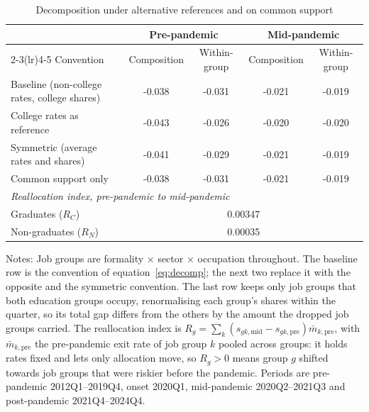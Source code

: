 \begin{table}[H]
\centering
\caption{Decomposition under alternative references and on common support}
\label{tab:decomp_variants}
\begin{threeparttable}
\begin{tabular}{lcccc}
\toprule
& \multicolumn{2}{c}{Pre-pandemic} & \multicolumn{2}{c}{Mid-pandemic} \\
\cmidrule(lr){2-3}\cmidrule(lr){4-5}
Convention & Composition & Within-group & Composition & Within-group \\
\midrule
Baseline (non-college rates, college shares) & -0.038 & -0.031 & -0.021 & -0.019 \\
College rates as reference & -0.043 & -0.026 & -0.020 & -0.020 \\
Symmetric (average rates and shares) & -0.041 & -0.029 & -0.021 & -0.019 \\
Common support only & -0.038 & -0.031 & -0.021 & -0.019 \\
\midrule
\multicolumn{5}{l}{\textit{Reallocation index, pre-pandemic to mid-pandemic}} \\
\quad Graduates ($R_C$) & \multicolumn{4}{c}{0.00347} \\
\quad Non-graduates ($R_N$) & \multicolumn{4}{c}{0.00035} \\
\bottomrule
\end{tabular}
\begin{tablenotes}[flushleft]\footnotesize
\item Notes: Job groups are formality $\times$ sector $\times$ occupation throughout. The baseline row is the convention of equation~\eqref{eq:decomp}; the next two replace it with the opposite and the symmetric convention. The last row keeps only job groups that both education groups occupy, renormalising each group's shares within the quarter, so its total gap differs from the others by the amount the dropped job groups carried. The reallocation index is $R_g = \sum_k (s_{gk,\text{mid}} - s_{gk,\text{pre}})\bar m_{k,\text{pre}}$, with $\bar m_{k,\text{pre}}$ the pre-pandemic exit rate of job group $k$ pooled across groups: it holds rates fixed and lets only allocation move, so $R_g > 0$ means group $g$ shifted towards job groups that were riskier before the pandemic. Periods are pre-pandemic 2012Q1--2019Q4, onset 2020Q1, mid-pandemic 2020Q2--2021Q3 and post-pandemic 2021Q4--2024Q4.
\end{tablenotes}
\end{threeparttable}
\end{table}
